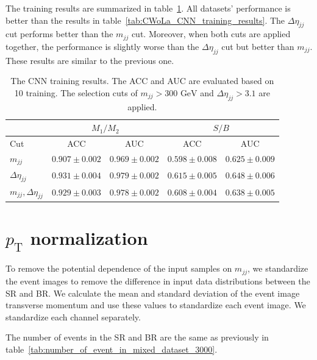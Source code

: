 \documentclass[12pt]{article}
\begin{document}
        The training results are summarized in table~\ref{tab:CWoLa_CNN_training_results_3000}. All datasets' performance is better than the results in table~\ref{tab:CWoLa_CNN_training_results}. The $\Delta\eta_{jj}$ cut performs better than the $m_{jj}$ cut. Moreover, when both cuts are applied together, the performance is slightly worse than the $\Delta\eta_{jj}$ cut but better than $m_{jj}$. These results are similar to the previous one. 
        \begin{table}[htpb]
            \centering
            \caption{The CNN training results. The ACC and AUC are evaluated based on 10 training. The selection cuts of $m_{jj} > \text{300 GeV}$ and $\Delta\eta_{jj} > 3.1$ are applied.}
            \label{tab:CWoLa_CNN_training_results_3000}
            \begin{tabular}{l|cc|cc}
                                          & \multicolumn{2}{c|}{$M_1 / M_2$}      & \multicolumn{2}{c}{$S / B$}           \\ \hline
                Cut                       & ACC               & AUC               & ACC               & AUC               \\ \hline
                $m_{jj}$                  & $0.907 \pm 0.002$ & $0.969 \pm 0.002$ & $0.598 \pm 0.008$ & $0.625 \pm 0.009$ \\
                $\Delta\eta_{jj}$         & $0.931 \pm 0.004$ & $0.979 \pm 0.002$ & $0.615 \pm 0.005$ & $0.648 \pm 0.006$ \\
                $m_{jj}, \Delta\eta_{jj}$ & $0.929 \pm 0.003$ & $0.978 \pm 0.002$ & $0.608 \pm 0.004$ & $0.638 \pm 0.005$
            \end{tabular}
        \end{table}
\section{\texorpdfstring{$p_{\mathrm{T}}$}{pT} normalization}%
\label{sec:pt_normalization}
    
    To remove the potential dependence of the input samples on $m_{jj}$, we standardize the event images to remove the difference in input data distributions between the SR and BR. We calculate the mean and standard deviation of the event image transverse momentum and use these values to standardize each event image. We standardize each channel separately.
    
    The number of events in the SR and BR are the same as previously in table~\ref{tab:number_of_event_in_mixed_dataset_3000}.
\end{document}
